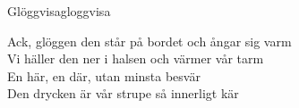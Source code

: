 \begin{song}{Glöggvisa}{gloggvisa}
\begin{vers}
Ack, glöggen den står på bordet och ångar sig varm\\
Vi häller den ner i halsen och värmer vår tarm\\
En här, en där, utan minsta besvär\\
Den drycken är vår strupe så innerligt kär\\
\end{vers}
\end{song}
